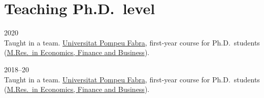 \section*{Teaching \small{Ph.D.\ level}}

\begin{paracol}{2}
  \textsc{2020}
\switchcolumn
  \\
  Taught in a team.
  \href{https://www.upf.edu/}{Universitat Pompeu Fabra}, first-year course for Ph.D.\ students (\href{https://www.upf.edu/web/econ/mres-i-phd}{M.Res.\ in Economics, Finance and Business}).
\end{paracol}

\begin{paracol}{2}
  \textsc{2018--20}
\switchcolumn
  \\
  Taught in a team.
  \href{https://www.upf.edu/}{Universitat Pompeu Fabra}, first-year course for Ph.D.\ students (\href{https://www.upf.edu/web/econ/mres-i-phd}{M.Res.\ in Economics, Finance and Business}).
\end{paracol}